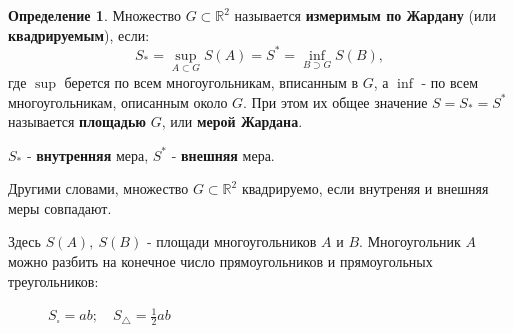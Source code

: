 \documentclass{report}
\theoremstyle{definition}
\newtheorem*{definition}{Определение}
\begin{document}
\begin{definition}
    Множество $G\subset\mathbb{R}^2$ называется \textbf{измеримым по Жардану} (или \textbf{квадрируемым}),
    если:
    \begin{equation*}
        S_* = \underset{A\subset G}{\sup} S(A) = S^* = \underset{B\supset G}{\inf}S(B),
    \end{equation*}
    где $\sup$ берется по всем многоугольникам, вписанным в $G$, а $\inf$ - по всем многоугольникам,
    описанным около $G$. При этом их общее значение $S = S_* = S^*$ называется \textbf{площадью} $G$,
    или \textbf{мерой Жардана}.
    \begin{center}
        $S_*$ - \textbf{внутренняя} мера, $S^*$ - \textbf{внешняя} мера.
    \end{center}

    Другими словами, множество $G\subset\mathbb{R}^2$ квадрируемо, если внутреняя и внешняя меры совпадают.

    Здесь $S(A),\ S(B)$ - площади многоугольников $A$ и $B$. Многоугольник $A$ можно разбить на конечное число
    прямоугольников и прямоугольных треугольников:
    \begin{figure}[h]
        \begin{minipage}[h]{0.49\linewidth}
        \end{minipage}
        \hfill
        \begin{minipage}[h]{0.49\linewidth}
            $S_\square = ab; \quad S_\triangle = \frac{1}{2}ab$
        \end{minipage}
    \end{figure}
\end{definition}
\end{document}
